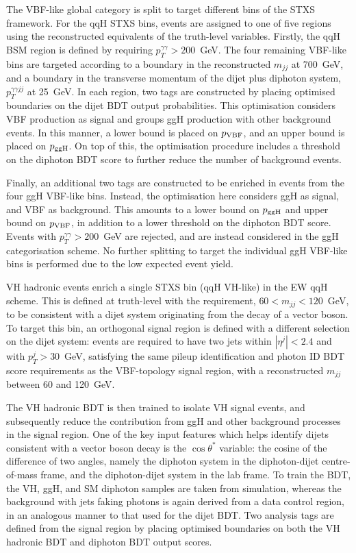 The VBF-like global category is split to target different bins of the STXS framework. For the qqH STXS bins, events are assigned to one of five regions using the reconstructed equivalents of the truth-level variables. Firstly, the qqH BSM region is defined by requiring $p_T^{\gamma\gamma}>200$~GeV. The four remaining VBF-like bins are targeted according to a boundary in the reconstructed $m_{jj}$ at 700~GeV, and a boundary in the transverse momentum of the dijet plus diphoton system, $p_T^{\gamma\gamma jj}$ at 25~GeV. In each region, two tags are constructed by placing optimised boundaries on the dijet BDT output probabilities. This optimisation considers VBF production as signal and groups ggH production with other background events. In this manner, a lower bound is placed on $p_{\rm{VBF}}$, and an upper bound is placed on $p_{\rm{ggH}}$. On top of this, the optimisation procedure includes a threshold on the diphoton BDT score to further reduce the number of background events.

Finally, an additional two tags are constructed to be enriched in events from the four ggH VBF-like bins. Instead, the optimisation here considers ggH as signal, and VBF as background. This amounts to a lower bound on $p_{\rm{ggH}}$ and upper bound on $p_{\rm{VBF}}$, in addition to a lower threshold on the diphoton BDT score. Events with $p_T^{\gamma\gamma}>200$~GeV are rejected, and are instead considered in the ggH categorisation scheme. No further splitting to target the individual ggH VBF-like bins is performed due to the low expected event yield. 

VH hadronic events enrich a single STXS bin (qqH VH-like) in the EW qqH scheme. This is defined at truth-level with the requirement, $60<m_{jj}<120$~GeV, to be consistent with a dijet system originating from the decay of a vector boson. To target this bin, an orthogonal signal region is defined with a different selection on the dijet system: events are required to have two jets within $|\eta^j|<2.4$ and with $p_T^j>30$~GeV, satisfying the same pileup identification and photon ID BDT score requirements as the VBF-topology signal region, with a reconstructed $m_{jj}$ between 60 and 120~GeV. 

The VH hadronic BDT is then trained to isolate VH signal events, and subsequently reduce the contribution from ggH and other background processes in the signal region. One of the key input features which helps identify dijets consistent with a vector boson decay is the $\cos{\theta^*}$ variable: the cosine of the difference of two angles, namely the diphoton system in the diphoton-dijet centre-of-mass frame, and the diphoton-dijet system in the lab frame. To train the BDT, the VH, ggH, and SM diphoton samples are taken from simulation, whereas the background with jets faking photons is again derived from a data control region, in an analogous manner to that used for the dijet BDT. Two analysis tags are defined from the signal region by placing optimised boundaries on both the VH hadronic BDT and diphoton BDT output scores.

